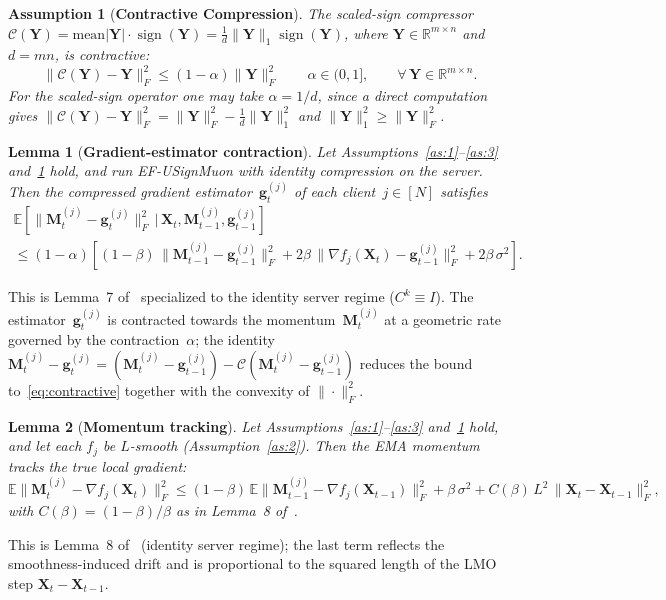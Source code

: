 \documentclass{article}
\newtheorem{lemma}{Lemma}
\newtheorem{assumption}{Assumption}
\begin{document}
\begin{assumption}[\textbf{Contractive Compression}]\label{as:5}
The scaled-sign compressor $\mathcal{C}(\mathbf{Y}) = \mathrm{mean}|\mathbf{Y}|\cdot\operatorname{sign}(\mathbf{Y}) = \tfrac{1}{d}\|\mathbf{Y}\|_1\operatorname{sign}(\mathbf{Y})$, where $\mathbf{Y}\in\mathbb{R}^{m\times n}$ and $d=mn$, is contractive:
\begin{equation}\label{eq:contractive}
\|\mathcal{C}(\mathbf{Y})-\mathbf{Y}\|_F^2 \le (1-\alpha)\|\mathbf{Y}\|_F^2 \qquad \alpha\in(0,1], \qquad\forall\,\mathbf{Y}\in\mathbb{R}^{m\times n}.
\end{equation}
For the scaled-sign operator one may take $\alpha=1/d$, since a direct computation gives $\|\mathcal{C}(\mathbf{Y})-\mathbf{Y}\|_F^2 = \|\mathbf{Y}\|_F^2 - \tfrac{1}{d}\|\mathbf{Y}\|_1^2$ and $\|\mathbf{Y}\|_1^2 \ge \|\mathbf{Y}\|_F^2$.
\end{assumption}

\begin{lemma}[\textbf{Gradient-estimator contraction}]\label{lem:est}
Let Assumptions~\ref{as:1}--\ref{as:3} and~\ref{as:5} hold, and run EF-USignMuon with identity compression on the server. Then the compressed gradient estimator~$\mathbf{g}_t^{(j)}$ of each client~$j\in[N]$ satisfies
\begin{multline}
\mathbb{E}\!\left[\|\mathbf{M}_t^{(j)}-\mathbf{g}_t^{(j)}\|_F^2 \,\big|\, \mathbf{X}_t,\mathbf{M}_{t-1}^{(j)},\mathbf{g}_{t-1}^{(j)}\right] \\
\le (1-\alpha)\!\left[(1-\beta)\,\|\mathbf{M}_{t-1}^{(j)}-\mathbf{g}_{t-1}^{(j)}\|_F^2 + 2\beta\,\|\nabla f_j(\mathbf{X}_t)-\mathbf{g}_{t-1}^{(j)}\|_F^2 + 2\beta\,\sigma^2\right].
\end{multline}
\end{lemma}
\noindent This is Lemma~7 of~\cite{gruntkowska2025error} specialized to the identity server regime ($C^k \equiv I$). The estimator~$\mathbf{g}_t^{(j)}$ is contracted towards the momentum~$\mathbf{M}_t^{(j)}$ at a geometric rate governed by the contraction~$\alpha$; the identity $\mathbf{M}_t^{(j)}-\mathbf{g}_t^{(j)} = (\mathbf{M}_t^{(j)}-\mathbf{g}_{t-1}^{(j)}) - \mathcal{C}(\mathbf{M}_t^{(j)}-\mathbf{g}_{t-1}^{(j)})$ reduces the bound to~\eqref{eq:contractive} together with the convexity of $\|\cdot\|_F^2$.

\begin{lemma}[\textbf{Momentum tracking}]\label{lem:mom}
Let Assumptions~\ref{as:1}--\ref{as:3} and~\ref{as:5} hold, and let each $f_j$ be $L$-smooth (Assumption~\ref{as:2}). Then the EMA momentum tracks the true local gradient:
\begin{equation}
\mathbb{E}\|\mathbf{M}_t^{(j)}-\nabla f_j(\mathbf{X}_t)\|_F^2 \le (1-\beta)\,\mathbb{E}\|\mathbf{M}_{t-1}^{(j)}-\nabla f_j(\mathbf{X}_{t-1})\|_F^2 + \beta\,\sigma^2 + C(\beta)\,L^2\,\|\mathbf{X}_t-\mathbf{X}_{t-1}\|_F^2,
\end{equation}
with $C(\beta)=(1-\beta)/\beta$ as in Lemma~8 of~\cite{gruntkowska2025error}.
\end{lemma}
\noindent This is Lemma~8 of~\cite{gruntkowska2025error} (identity server regime); the last term reflects the smoothness-induced drift and is proportional to the squared length of the LMO step $\mathbf{X}_t-\mathbf{X}_{t-1}$.
\end{document}
